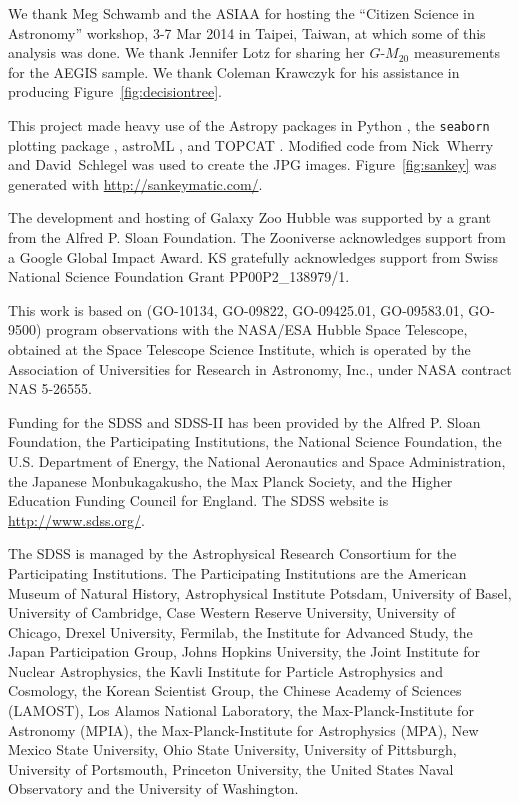 \documentclass[twocolumn]{aastex6}
\begin{document}
\acknowledgments

We thank Meg Schwamb and the ASIAA for hosting the ``Citizen Science in
Astronomy'' workshop, 3-7 Mar 2014 in Taipei, Taiwan, at which some of this
analysis was done. We thank Jennifer Lotz for sharing her $G$-$M_{20}$
measurements for the AEGIS sample. We thank Coleman Krawczyk for his assistance
in producing Figure~\ref{fig:decisiontree}.

This project made heavy use of the Astropy packages in Python \citep{ast13},
the \texttt{seaborn} plotting package \citep{was15}, astroML \citep{van12}, and
TOPCAT \citep{tay05,tay11}. Modified code from Nick~Wherry and David~Schlegel
was used to create the JPG images. Figure~\ref{fig:sankey} was generated with
\url{http://sankeymatic.com/}.

The development and hosting of Galaxy Zoo Hubble was supported by a grant from
the Alfred P. Sloan Foundation. The Zooniverse acknowledges support from a
Google Global Impact Award. KS gratefully acknowledges support from Swiss
National Science Foundation Grant PP00P2\_138979/1.

This work is based on (GO-10134, GO-09822, GO-09425.01, GO-09583.01, GO-9500)
program observations with the NASA/ESA Hubble Space Telescope, obtained at the
Space Telescope Science Institute, which is operated by the Association of
Universities for Research in Astronomy, Inc., under NASA contract NAS 5-26555. 

Funding for the SDSS and SDSS-II has been provided by the Alfred P. Sloan
Foundation, the Participating Institutions, the National Science Foundation,
the U.S. Department of Energy, the National Aeronautics and Space
Administration, the Japanese Monbukagakusho, the Max Planck Society, and the
Higher Education Funding Council for England. The SDSS website is
\url{http://www.sdss.org/}. 

The SDSS is managed by the Astrophysical Research Consortium for the
Participating Institutions. The Participating Institutions are the American
Museum of Natural History, Astrophysical Institute Potsdam, University of
Basel, University of Cambridge, Case Western Reserve University, University of
Chicago, Drexel University, Fermilab, the Institute for Advanced Study, the
Japan Participation Group, Johns Hopkins University, the Joint Institute for
Nuclear Astrophysics, the Kavli Institute for Particle Astrophysics and
Cosmology, the Korean Scientist Group, the Chinese Academy of Sciences
(LAMOST), Los Alamos National Laboratory, the Max-Planck-Institute for
Astronomy (MPIA), the Max-Planck-Institute for Astrophysics (MPA), New Mexico
State University, Ohio State University, University of Pittsburgh, University
of Portsmouth, Princeton University, the United States Naval Observatory and
the University of Washington. 
\end{document}
